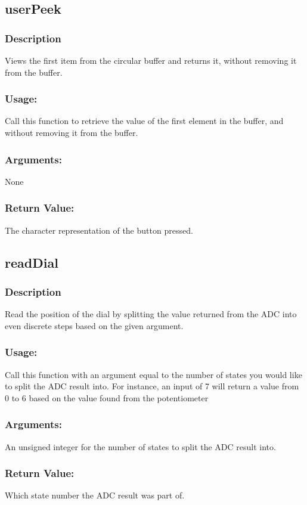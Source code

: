 \documentclass[]{report}
\begin{document}
\subsection{userPeek}
\subsubsection{Description}
Views the first item from the circular buffer and returns it, without removing it from the buffer.
\subsubsection{Usage:}
Call this function to retrieve the value of the first element in the buffer, and without removing it from the buffer.

\subsubsection{Arguments:}
None
\subsubsection{Return Value:}
The character representation of the button pressed.

\subsection{readDial}
\subsubsection{Description}
Read the position of the dial by splitting the value returned from the ADC into even discrete steps based on the given argument.
\subsubsection{Usage:}
Call this function with an argument equal to the number of states you would like to split the ADC result into. For instance, an input of 7 will return a value from 0 to 6 based on the value found from the potentiometer

\subsubsection{Arguments:}
An unsigned integer for the number of states to split the ADC result into. 
\subsubsection{Return Value:}
Which state number the ADC result was part of. 
\end{document}
